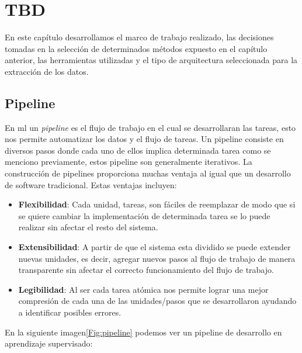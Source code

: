 \chapter{TBD}\label{ch:undefined}
En este capítulo desarrollamos el marco de trabajo realizado, las decisiones tomadas en la selección de determinados métodos expuesto en el capítulo anterior, las  herramientas utilizadas y el tipo de arquitectura seleccionada para la extracción de los datos.

\section{Pipeline}\label{sec: pipeline}
En \ac{ml} un \textit{pipeline} es el flujo de trabajo en el cual se desarrollaran las tareas, esto nos permite automatizar los datos y el flujo de tareas. Un pipeline consiste en diversos pasos donde cada uno de ellos implica determinada tarea como se menciono previamente, estos pipeline son generalmente iterativos.
La construcción de pipelines proporciona muchas ventaja al igual que un desarrollo de software tradicional. Estas ventajas incluyen:
\begin{itemize}
\item \textbf{Flexibilidad}: Cada unidad, tareas, son fáciles de reemplazar de modo que si se quiere cambiar la implementación de determinada tarea se lo puede realizar sin afectar el resto del sistema.

\item \textbf{Extensibilidad}: A partir de que el sistema esta dividido se puede extender nuevas unidades, es decir, agregar nuevos pasos al flujo de trabajo de manera transparente sin afectar el correcto funcionamiento del flujo de trabajo.

\item \textbf{Legibilidad}: Al ser cada tarea atómica nos permite lograr una mejor compresión de cada una de las unidades/pasos que se desarrollaron ayudando a identificar posibles errores.

\end{itemize}

En la siguiente imagen\ref{Fig:pipeline} podemos ver un pipeline de desarrollo en aprendizaje supervisado:

